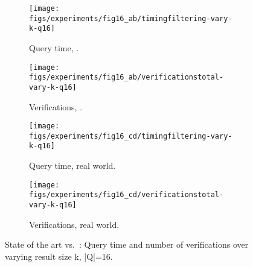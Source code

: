 \begin{figure*}[ht!]
  \centering
  \begin{subfigure}[b]{0.225\textwidth}
    \centering
    \texttt{[image: figs/experiments/fig16\_ab/timingfiltering-vary-k-q16]}
    \caption{Query time, .}
    \label{fig:tasm-struct-slim-timingfiltering-vary-k-q16-synthetic}
  \end{subfigure}
  \quad
  \begin{subfigure}[b]{0.225\textwidth}
    \centering
    \texttt{[image: figs/experiments/fig16\_ab/verificationstotal-vary-k-q16]}
    \caption{Verifications, .}
    \label{fig:tasm-struct-slim-verificationstotal-vary-k-q16-synthetic}
  \end{subfigure}
  \quad
  \begin{subfigure}[b]{0.225\textwidth}
    \centering
    \texttt{[image: figs/experiments/fig16\_cd/timingfiltering-vary-k-q16]}
    \caption{Query time, real world.}
    \label{fig:tasm-struct-slim-timingfiltering-vary-k-q16-realworld}
  \end{subfigure}
  \quad
  \begin{subfigure}[b]{0.225\textwidth}
    \centering
    \texttt{[image: figs/experiments/fig16\_cd/verificationstotal-vary-k-q16]}
    \caption{Verifications, real world.}
    \label{fig:tasm-struct-slim-verificationstotal-vary-k-q16-realworld}
  \end{subfigure}
  \caption{State of the art vs.\ \shinconeshort{}: Query time and number of verifications over varying result size k, |Q|=16.}
  \label{fig:tasm-struct-slim-timingfiltering-verificationstotal-vary-k-q16}
\end{figure*}
